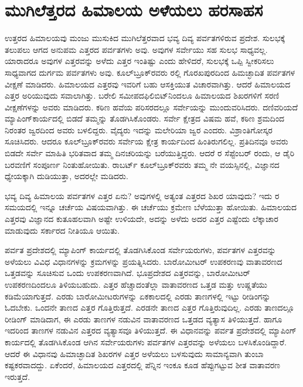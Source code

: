 
\chapter{ಮುಗಿಲೆತ್ತರದ ಹಿಮಾಲಯ ಅಳೆಯಲು ಹರಸಾಹಸ}

ಉತ್ತರದ ಹಿಮಾಲಯವು ಮಂಜು ಮುಸುಕಿದ ಮುಗಿಲೆತ್ತರವಾದ ಭವ್ಯ ದಿವ್ಯ ಪರ್ವತಗಳಿರುವ ಪ್ರದೇಶ. ಸುಲಭಕ್ಕೆ ತಲುಪಲು ಆಗದ ಅನುಪಮ ಎತ್ತರದ ಪರ್ವತಗಳು ಅವು. ಅವುಗಳ ಸರ್ವೇಯು ಸಹ ಸುಲಭ ಸಾಧ್ಯವಲ್ಲ. ಯಾರಾದರೂ ಅವುಗಳ ಎತ್ತರವನ್ನು ಅಳೆದು ಎತ್ತರ ಇಂತಿಷ್ಟು ಎಂದು ಹೇಳಿದರೆ, ಸುಲಭಕ್ಕೆ ಒಪ್ಪಿ ಸ್ವೀಕರಿಸಲು ಸಾಧ್ಯವಾಗದ ದುರ್ಗಮ ಪರ್ವತಗಳು ಅವು. ಕೂಲ್​ಬ್ರೂಕ್​ರವರು ರಲ್ಲಿ ಗೊರಖಪುರದಿಂದ ಹಿಮಚ್ಛಾದಿತ ಪರ್ವತಗಳ ವೀಕ್ಷಣೆ ಮಾಡಿದರು. ಹಿಮಾಲಯದ ಎತ್ತರವು ಇವರಿಗೆ ಬಹು ಆಸಕ್ತಿಯುತ ವಿಚಾರವಾಗಿತ್ತು. ಆದರೆ ಹಿಮಾಲಯದ ಎತ್ತರ ಅರಿಯುವುದು ಸವಾಲಾಗಿತ್ತು. ಬರೇಲಿ ಸಮೀಪದ\break ಫಿಲಿಬಿಟ್​ನಿಂದಲೂ ಹಿಮಾಲಯದ ಶಿಖರಗಳಿಗೆ ಸರಣಿ ವೀಕ್ಷಣೆಗಳನ್ನು ಅವರು ಮಾಡಿದರು. ಕಠಿಣ ಹವೆಯ ಪರಿಸರದಲ್ಲೂ ಸರ್ವೇಯನ್ನು ಮುಂದುವರಿಸಿದರು. ದಣಿವರಿಯದೆ ಮ್ಯಾಪಿಂಗ್​ ಕಾರ್ಯದಲ್ಲಿ ಬಿಡದೆ ತಮ್ಮನ್ನು ತೊಡಗಿಸಿಕೊಂಡರು. ಸರ್ವೇ ಕ್ಷೇತ್ರದ ವಿಷಮ ಹವೆ, ಕಠಿಣ ಶ್ರಮದಿಂದ ನಿರಂತರ ಜ್ವರದಿಂದ ಅವರು ಬಳಲಿದ್ದರು. ವೈದ್ಯರು ಇದನ್ನು ಮಲೇರಿಯಾ ಜ್ವರ ಎಂದರು. ವಿಶ್ರಾಂತಿಗೋಸ್ಕರ ಸೂಚಿಸಿದರು. ಆದರೂ ಕೂಲ್​ಬ್ರೂಕ್​ರವರು ಸರ್ವೇಯ ಕ್ಷೇತ್ರ ಕಾರ್ಯದಿಂದ ಹಿಂತಿರುಗಲಿಲ್ಲ. ಪ್ರತಿದಿನವೂ ಅವರು ಬಿಡದೇ ಸರ್ವೇ ಮಾಹಿತಿ ಭರಿತವಾದ ತಮ್ಮ ದಿನಚರಿಯನ್ನು ಬರೆಯುತ್ತಿದ್ದರು. ಆದರೆ ರ ಸೆಪ್ಟೆಂಬರ್​ ರಂದು, ಆ ಡೈರಿ ಬರವಣಿಗೆ ಸಂಪೂರ್ಣ ನಿಂತುಹೋಯಿತು. ರಾಬರ್ಟ್ ಕೂಲ್​ಬ್ರೂಕ್​ರವರು ತಮ್ಮ ನೇ ವಯಸ್ಸಿನಲ್ಲಿ, ವಿಜ್ಞಾನದ ಧ್ಯೇಯಕ್ಕಾಗಿ ದುಡಿಯುತ್ತಾ, ಅದರಲ್ಲೇ ಮಡಿದರು.

ಭವ್ಯ ದಿವ್ಯ ಹಿಮಾಲಯ ಪರ್ವತಗಳ ಎತ್ತರ ಏನು? ಅವುಗಳಲ್ಲಿ ಅತ್ಯಂತ ಎತ್ತರದ ಶಿಖರ ಯಾವುದು? ಇದು ರ ಸಮಯದಲ್ಲಿ ಇನ್ನೂ ಚರ್ಚೆಯ ವಿಷಯವಾಗಿತ್ತು. ಈ ಚರ್ಚೆಯು ಕ್ರಮೇಣ ಬೆಳೆಯುತ್ತಾ ಹೋಯಿತು. ಹಿಮಾಲಯದ ಎತ್ತರವು ವಿಜ್ಞಾನದ ಕುತೂಹಲವಾಗಿ ಅಷ್ಟೇ ಉಳಿಯದೇ, ಅದನ್ನು ಅಳೆದು ಅದರ ಎತ್ತರ ಎಷ್ಟೆಂದು ಲೆಕ್ಕಾಚಾರ ಮಾಡುವುದು ಸರ್ಕಾರದ ನೀತಿಯೂ ಆಯಿತು.

ಪರ್ವತ ಪ್ರದೇಶದಲ್ಲಿ ಮ್ಯಾಪಿಂಗ್​ ಕಾರ್ಯದಲ್ಲಿ ತೊಡಗಿಸಿಕೊಂಡ ಸರ್ವೇಯರುಗಳು, ಪರ್ವತಗಳ ಎತ್ತರವನ್ನು ಅಳೆಯಲು ವಿವಿಧ ವಿಧಾನಗಳನ್ನು ಕ್ರಮಗಳನ್ನು ಪ್ರಯತ್ನಿಸಿದರು. ಬಾರೋಮೀಟರ್​ ಉಪಕರಣವು ವಾತಾವರಣದ ಒತ್ತಡವನ್ನು ಸೂಚಿಸುವ ಒಂದು ಉಪಕರಣವಾಗಿದೆ. ಭೂಪ್ರದೇಶದ ಎತ್ತರವನ್ನು, ಬಾರೋಮೀಟರ್​ ಉಪಕರಣದಿಂದಲೂ ತಿಳಿಯಬಹುದು. ಎತ್ತರ ಹೆಚ್ಚಾದಂತೆಲ್ಲಾ ವಾತಾವರಣದ ಒತ್ತಡ ಮತ್ತು ಉಷ್ಣತೆಯು ಕಡಿಮೆಯಾಗುತ್ತದೆ. ಎರಡು ಬಾರೋಮೀಟರುಗಳನ್ನು ಏಕಕಾಲದಲ್ಲಿ ಎರಡು ತಾಣಗಳಲ್ಲಿ ಇಟ್ಟು ರೀಡಿಂಗನ್ನು ಓದಬೇಕು. ಒಂದನೇ ತಾಣದ ಎತ್ತರ ಗೊತ್ತಿರುತ್ತದೆ. ಎರಡನೇ ತಾಣದ ಎತ್ತರ ಗೊತ್ತಿರುವುದಿಲ್ಲ. ಎರಡು ತಾಣದಲ್ಲೂ ರೀಡಿಂಗ್​ ಮಾಡಿದಾಗ, ಈ ಎರಡು ತಾಣಗಳ ನಡುವಿನ ವಾತಾವರಣದ ಒತ್ತಡದ ವ್ಯತ್ಯಾಸ ತಿಳಿಯುತ್ತದೆ. ಹಾಗೂ ಇದರಿಂದ ತಾಣಗಳ ನಡುವಿನ ಎತ್ತರದ ವ್ಯತ್ಯಾಸವೂ ತಿಳಿಯುತ್ತದೆ. ಈ ವಿಧಾನವನ್ನು ಪರ್ವತ ಪ್ರದೇಶದಲ್ಲಿ ಮ್ಯಾಪಿಂಗ್​ ಕಾರ್ಯದಲ್ಲಿ ತೊಡಗಿಸಿಕೊಂಡ ಆಗಿನ ಸರ್ವೇಯರುಗಳು ಪರ್ವತಗಳ ಎತ್ತರವನ್ನು ಅಳೆಯಲು ಬಳಸಿಕೊಂಡಿದ್ದಾರೆ. ಆದರೆ ಈ ವಿಧಾನವು ಹಿಮಾಚ್ಛಾದಿತ ಶಿಖರಗಳ ಎತ್ತರ ಅಳೆಯಲು ಬಳಸುವುದು ಸಾಮಾನ್ಯವಾಗಿ ತುಂಬಾ ಕಷ್ಟಕರವಾದದ್ದು. ಏಕೆಂದರೆ, ಹಿಮಾಲಯದ ಎತ್ತರದಲ್ಲಿ ಪೆನ್ನಿನ ಇಂಕೂ ಕೂಡ ಹೆಪ್ಪುಗಟ್ಟುವ ಶೀತ ವಾತಾವರಣ ಇರುತ್ತದೆ.

